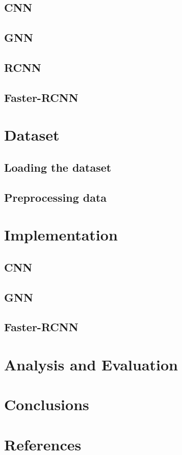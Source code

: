 \documentclass[12pt]{article}
\begin{document}
\subsection{CNN}
\subsection{GNN}
\subsection{RCNN}
\subsection{Faster-RCNN}
    
\section{Dataset}
\subsection{Loading the dataset}
\subsection{Preprocessing data}

\section{Implementation}
\subsection{CNN}
\subsection{GNN}
\subsection{Faster-RCNN}

\section{Analysis and Evaluation}

\section{Conclusions}

\section{References}
\end{document}

